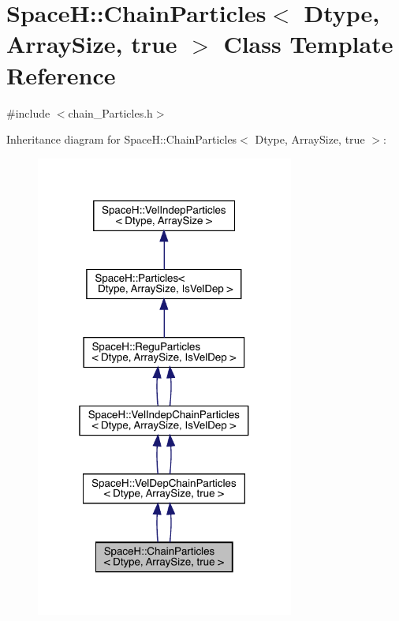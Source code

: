 \hypertarget{class_space_h_1_1_chain_particles_3_01_dtype_00_01_array_size_00_01true_01_4}{}\section{SpaceH\+:\+:Chain\+Particles$<$ Dtype, Array\+Size, true $>$ Class Template Reference}
\label{class_space_h_1_1_chain_particles_3_01_dtype_00_01_array_size_00_01true_01_4}


{\ttfamily \#include $<$chain_\+Particles.\+h$>$}



Inheritance diagram for SpaceH\+:\+:Chain\+Particles$<$ Dtype, Array\+Size, true $>$\+:
\nopagebreak
\begin{figure}[H]
\begin{center}
\leavevmode
\includegraphics[width=241pt]{class_space_h_1_1_chain_particles_3_01_dtype_00_01_array_size_00_01true_01_4__inherit__graph}
\end{center}
\end{figure}


